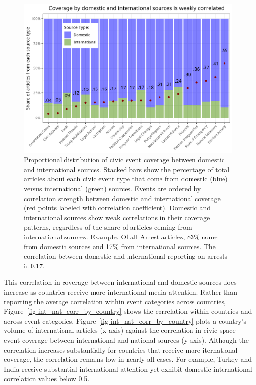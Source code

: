 \documentclass[
  letterpaper,
  DIV=11,
  numbers=noendperiod]{scrartcl}
\begin{document}
\begin{figure}

{\centering \includegraphics{source_comparison/figures/int_share_norm.png}

}

\caption{\label{fig-int_share_norm}Proportional distribution of civic
event coverage between domestic and international sources. Stacked bars
show the percentage of total articles about each civic event type that
come from domestic (blue) versus international (green) sources. Events
are ordered by correlation strength between domestic and international
coverage (red points labeled with correlation coefficient). Domestic and
international sources show weak correlations in their coverage patterns,
regardless of the share of articles coming from international sources.
Example: Of all Arrest articles, 83\% come from domestic sources and
17\% from international sources. The correlation between domestic and
international reporting on arrests is 0.17.}

\end{figure}

This correlation in coverage between international and domestic sources
does increase as countries receive more international media attention.
Rather than reporting the average correlation within event categories
across countries, Figure~\ref{fig-int_nat_corr_by_country} shows the
correlation within countries and across event categories.
Figure~\ref{fig-int_nat_corr_by_country} plots a country's volume of
international articles (x-axis) against the correlation in civic space
event coverage between international and national sources (y-axis).
Although the correlation increases substantially for countries that
receive more iternational coverage, the correlation remains low in
nearly all cases. For example, Turkey and India receive substantial
international attention yet exhibit domestic-international correlation
values below 0.5.
\end{document}
